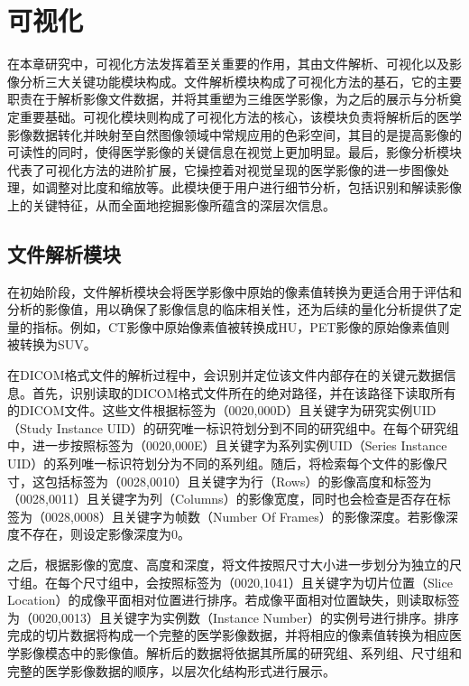 \section{可视化}

在本章研究中，可视化方法发挥着至关重要的作用，其由文件解析、可视化以及影像分析三大关键功能模块构成。文件解析模块构成了可视化方法的基石，它的主要职责在于解析影像文件数据，并将其重塑为三维医学影像，为之后的展示与分析奠定重要基础。可视化模块则构成了可视化方法的核心，该模块负责将解析后的医学影像数据转化并映射至自然图像领域中常规应用的色彩空间，其目的是提高影像的可读性的同时，使得医学影像的关键信息在视觉上更加明显。最后，影像分析模块代表了可视化方法的进阶扩展，它操控着对视觉呈现的医学影像的进一步图像处理，如调整对比度和缩放等。此模块便于用户进行细节分析，包括识别和解读影像上的关键特征，从而全面地挖掘影像所蕴含的深层次信息。

\subsection{文件解析模块}

在初始阶段，文件解析模块会将医学影像中原始的像素值转换为更适合用于评估和分析的影像值，用以确保了影像信息的临床相关性，还为后续的量化分析提供了定量的指标。例如，CT影像中原始像素值被转换成HU，PET影像的原始像素值则被转换为SUV。

在DICOM格式文件的解析过程中，会识别并定位该文件内部存在的关键元数据信息。首先，识别读取的DICOM格式文件所在的绝对路径，并在该路径下读取所有的DICOM文件。这些文件根据标签为（0020,000D）且关键字为研究实例UID（Study Instance UID）的研究唯一标识符划分到不同的研究组中。在每个研究组中，进一步按照标签为（0020,000E）且关键字为系列实例UID（Series Instance UID）的系列唯一标识符划分为不同的系列组。随后，将检索每个文件的影像尺寸，这包括标签为（0028,0010）且关键字为行（Rows）的影像高度和标签为（0028,0011）且关键字为列（Columns）的影像宽度，同时也会检查是否存在标签为（0028,0008）且关键字为帧数（Number Of Frames）的影像深度。若影像深度不存在，则设定影像深度为0。

之后，根据影像的宽度、高度和深度，将文件按照尺寸大小进一步划分为独立的尺寸组。在每个尺寸组中，会按照标签为（0020,1041）且关键字为切片位置（Slice Location）的成像平面相对位置进行排序。若成像平面相对位置缺失，则读取标签为（0020,0013）且关键字为实例数（Instance Number）的实例号进行排序。排序完成的切片数据将构成一个完整的医学影像数据，并将相应的像素值转换为相应医学影像模态中的影像值。解析后的数据将依据其所属的研究组、系列组、尺寸组和完整的医学影像数据的顺序，以层次化结构形式进行展示。

